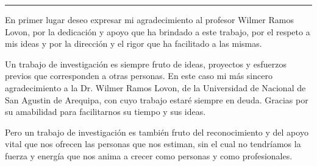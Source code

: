 \begin{acknowledgements}
\hrule \bigskip \vspace*{1cm}
En primer lugar deseo expresar mi agradecimiento al profesor Wilmer Ramos Lovon, por la dedicación y apoyo  que ha brindado a este trabajo, por el respeto a mis  ideas y por la dirección y el rigor que ha facilitado a las
mismas.

Un trabajo de investigación es siempre fruto de ideas, proyectos y esfuerzos previos que
corresponden a otras personas. En este caso mi más sincero agradecimiento a la Dr.
Wilmer Ramos Lovon, de la Universidad de Nacional de San Agustin de Arequipa, con cuyo trabajo estaré siempre en
deuda. Gracias por su amabilidad para facilitarnos su tiempo y sus ideas.


Pero un trabajo de investigación es también fruto del reconocimiento y del apoyo vital
que nos ofrecen las personas que nos estiman, sin el cual no tendríamos la fuerza y
energía que nos anima a crecer como personas y como profesionales.


\end{acknowledgements}
